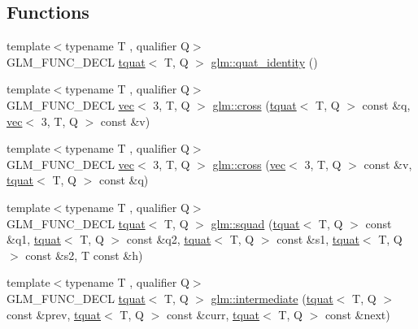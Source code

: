 \subsection*{Functions}
\begin{DoxyCompactItemize}
\item 
{\footnotesize template$<$typename T , qualifier Q$>$ }\\G\+L\+M\+\_\+\+F\+U\+N\+C\+\_\+\+D\+E\+CL \hyperlink{structglm_1_1tquat}{tquat}$<$ T, Q $>$ \hyperlink{group__gtx__quaternion_ga40788ce1d74fac29fa000af893a3ceb5}{glm\+::quat\+\_\+identity} ()
\item 
{\footnotesize template$<$typename T , qualifier Q$>$ }\\G\+L\+M\+\_\+\+F\+U\+N\+C\+\_\+\+D\+E\+CL \hyperlink{structglm_1_1vec}{vec}$<$ 3, T, Q $>$ \hyperlink{group__gtx__quaternion_ga8639615408166d0dddda1b91a940b338}{glm\+::cross} (\hyperlink{structglm_1_1tquat}{tquat}$<$ T, Q $>$ const \&q, \hyperlink{structglm_1_1vec}{vec}$<$ 3, T, Q $>$ const \&v)
\item 
{\footnotesize template$<$typename T , qualifier Q$>$ }\\G\+L\+M\+\_\+\+F\+U\+N\+C\+\_\+\+D\+E\+CL \hyperlink{structglm_1_1vec}{vec}$<$ 3, T, Q $>$ \hyperlink{group__gtx__quaternion_gaa75ca5654e0dc3b61c05db091f7d46ce}{glm\+::cross} (\hyperlink{structglm_1_1vec}{vec}$<$ 3, T, Q $>$ const \&v, \hyperlink{structglm_1_1tquat}{tquat}$<$ T, Q $>$ const \&q)
\item 
{\footnotesize template$<$typename T , qualifier Q$>$ }\\G\+L\+M\+\_\+\+F\+U\+N\+C\+\_\+\+D\+E\+CL \hyperlink{structglm_1_1tquat}{tquat}$<$ T, Q $>$ \hyperlink{group__gtx__quaternion_gacfcb16619e166e672c4672aff50a565c}{glm\+::squad} (\hyperlink{structglm_1_1tquat}{tquat}$<$ T, Q $>$ const \&q1, \hyperlink{structglm_1_1tquat}{tquat}$<$ T, Q $>$ const \&q2, \hyperlink{structglm_1_1tquat}{tquat}$<$ T, Q $>$ const \&s1, \hyperlink{structglm_1_1tquat}{tquat}$<$ T, Q $>$ const \&s2, T const \&h)
\item 
{\footnotesize template$<$typename T , qualifier Q$>$ }\\G\+L\+M\+\_\+\+F\+U\+N\+C\+\_\+\+D\+E\+CL \hyperlink{structglm_1_1tquat}{tquat}$<$ T, Q $>$ \hyperlink{group__gtx__quaternion_gac9be2084562a52ae8923813233563a28}{glm\+::intermediate} (\hyperlink{structglm_1_1tquat}{tquat}$<$ T, Q $>$ const \&prev, \hyperlink{structglm_1_1tquat}{tquat}$<$ T, Q $>$ const \&curr, \hyperlink{structglm_1_1tquat}{tquat}$<$ T, Q $>$ const \&next)
\item 

\end{DoxyCompactItemize}
